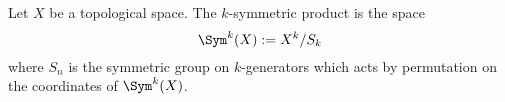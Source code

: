 

    Let $X$ be a topological space. The $k$-symmetric product is the space 
    \[\Sym^k(X):=X^k/S_k\]
    where $S_n$ is the symmetric group on $k$-generators which acts by permutation on the coordinates of $\Sym^k(X)$.
